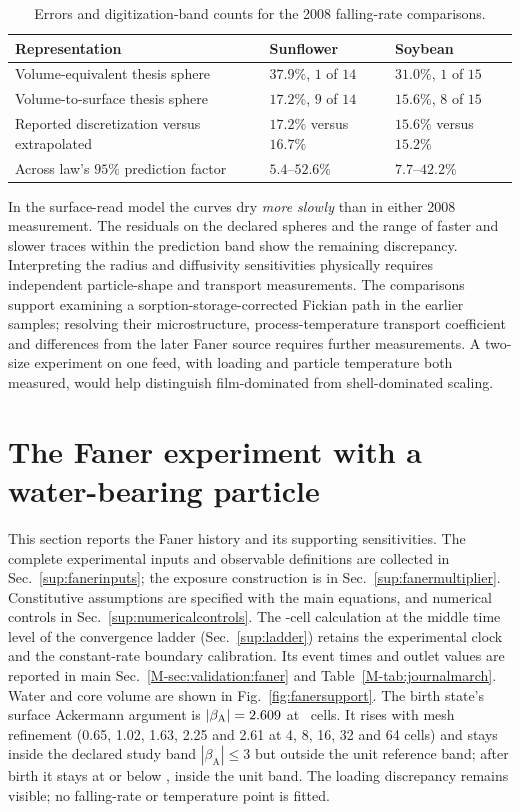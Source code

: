 \documentclass[11pt]{article}
\begin{document}
\begin{table}[htbp]\centering\footnotesize
\caption{Errors and digitization-band counts for the 2008 falling-rate comparisons.}\label{tab:sub:dry}
\begin{tabular}{@{}>{\raggedright\arraybackslash}p{}ll@{}}\toprule
Representation & Sunflower & Soybean\\\midrule
Volume-equivalent thesis sphere & $37.9\%$, $1$ of $14$ & $31.0\%$, $1$ of $15$\\
Volume-to-surface thesis sphere & $17.2\%$, $9$ of $14$ & $15.6\%$, $8$ of $15$\\
Reported discretization versus extrapolated & $17.2\%$ versus $16.7\%$ & $15.6\%$ versus $15.2\%$\\
Across law's $95\%$ prediction factor & $5.4$--$52.6\%$ & $7.7$--$42.2\%$\\
\bottomrule\end{tabular}\end{table}

In the surface-read model the curves dry \emph{more slowly} than in either 2008 measurement. The residuals on the declared spheres and the range of faster and slower traces within the prediction band show the remaining discrepancy. Interpreting the radius and diffusivity sensitivities physically requires independent particle-shape and transport measurements. The comparisons support examining a sorption-storage-corrected Fickian path in the earlier samples; resolving their microstructure, process-temperature transport coefficient and differences from the later Faner source requires further measurements. A two-size experiment on one feed, with loading and particle temperature both measured, would help distinguish film-dominated from shell-dominated scaling.

\section{The Faner experiment with a water-bearing particle}
\label{sup:journalmarch}\label{sup:journalensemble}
This section reports the Faner history and its supporting sensitivities.
The complete experimental inputs and observable definitions are collected
in Sec.~\ref{sup:fanerinputs}; the exposure construction is in
Sec.~\ref{sup:fanermultiplier}. Constitutive assumptions are specified with
the main equations, and numerical controls in Sec.~\ref{sup:numericalcontrols}.
The \FanerCells-cell calculation at the middle time level of the
convergence ladder (Sec.~\ref{sup:ladder}) retains the experimental clock
and the constant-rate boundary calibration. Its event times and outlet
values are reported in main Sec.~\ref*{M-sec:validation:faner} and
Table~\ref*{M-tab:journalmarch}. Water and core volume are shown in
Fig.~\ref{fig:fanersupport}. The birth state's surface Ackermann argument
is $|\beta_{\mathrm A}|=2.609$ at \FanerCells\ cells. It rises
with mesh refinement (0.65, 1.02, 1.63, 2.25 and 2.61 at 4, 8, 16, 32 and
64 cells) and stays inside the declared study band $|\beta_{\mathrm A}|\le3$
but outside the unit reference band; after birth it stays at or below
\FanerMaxBetaAfterBirth, inside the unit band. The loading discrepancy remains visible; no falling-rate or
temperature point is fitted.
\end{document}
